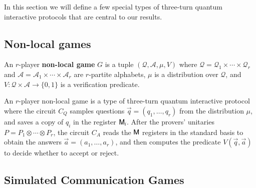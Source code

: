 In this section we will define a few special types of three-turn quantum interactive protocols that are central to our results. 


%
%
\subsection{Non-local games} 
An $r$-player \textbf{non-local game} $G$ is a tuple $(\mathcal{Q},\mathcal{A},\mu,V)$ where $\mathcal{Q} = \mathcal{Q}_1 \times \cdots \times \mathcal{Q}_r$ and $\mathcal{A} = \mathcal{A}_1 \times \cdots \times \mathcal{A}_r$ are $r$-partite alphabets, $\mu$ is a distribution over $\mathcal{Q}$, and $V: \mathcal{Q} \times \mathcal{A} \to \{0,1\}$ is a verification predicate. 


An $r$-player non-local game is a type of three-turn quantum interactive protocol where the circuit $C_Q$ samples questions $\vec{q} = (q_1,\ldots,q_r)$ from the distribution $\mu$, and saves a copy of $q_i$ in the register ${\mathsf{M}}_i$. After the provers' unitaries $P = P_1 \otimes \cdots \otimes P_r$, the circuit $C_A$ reads the ${\mathsf{M}}$ registers in the standard basis to obtain the answers $\vec{a} = (a_1,\ldots,a_r)$, and then computes the predicate $V(\vec{q},\vec{a})$ to decide whether to accept or reject.


\subsection{Simulated Communication Games}


